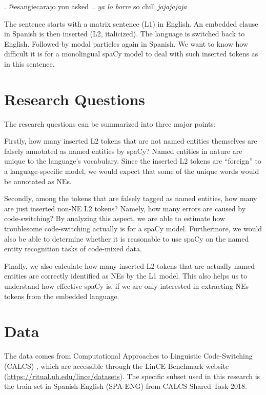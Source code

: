 \documentclass[11pt]{article}
\begin{document}
\ex. @esangiecarajo you asked .. \textit{ya lo borre} so chill \textit{jajajajaja}

The sentence starts with a matrix sentence (L1) in English. An embedded clause in Spanish is then inserted (L2, italicized). The language is switched back to English. Followed by modal particles again in Spanish. We want to know how difficult it is for a monolingual spaCy model to deal with such inserted tokens as in this sentence.


\section{Research Questions}

The research questions can be summarized into three major points:

Firstly, how many inserted L2 tokens that are not named entities themselves are falsely annotated as named entities by spaCy? Named entities in nature are unique to the language's vocabulary. Since the inserted L2 tokens are ``foreign'' to a language-specific model, we would expect that some of the unique words would be annotated as NEs.

Secondly, among the tokens that are falsely tagged as named entities, how many are just inserted non-NE L2 tokens? Namely, how many errors are caused by code-switching? By analyzing this aspect, we are able to estimate how troublesome code-switching actually is for a spaCy model. Furthermore, we would also be able to determine whether it is reasonable to use spaCy on the named entity recognition tasks of code-mixed data.


Finally, we also calculate how many inserted L2 tokens that are actually named entities are correctly identified as NEs by the L1 model. This also helps us to understand how effective spaCy is, if we are only interested in extracting NEs tokens from the embedded language.


\section{Data}

The data comes from Computational Approaches to Linguistic Code-Switching (CALCS) \citep{aguilaretal2018calcs}, which are accessible through the LinCE Benchmark website (\href{https://ritual.uh.edu/lince/datasets}{https://ritual.uh.edu/lince/datasets}). The specific subset used in this research is the train set in Spanish-English (SPA-ENG) from CALCS Shared Task 2018.
\end{document}
